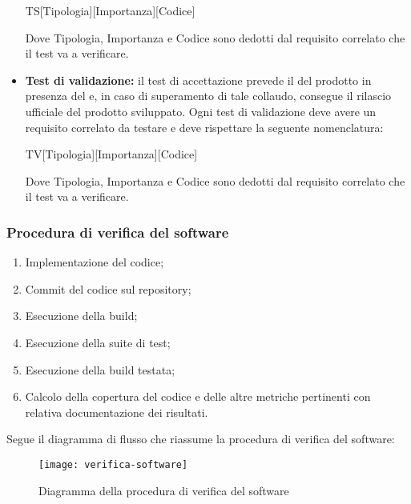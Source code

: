 \documentclass[../NormediProgetto.tex]{subfiles}
\begin{document}
\begin{itemize}
    \begin{center}
        TS[Tipologia][Importanza][Codice]
    \end{center}

    Dove Tipologia, Importanza e Codice sono dedotti dal requisito correlato che il test va a verificare.

    \item \textbf{Test di validazione:} il test di accettazione prevede il  del prodotto in presenza del  e, in caso di superamento di tale collaudo, consegue il rilascio ufficiale del prodotto sviluppato. Ogni test di validazione deve avere un requisito correlato da testare e deve rispettare la seguente nomenclatura:

    \begin{center}
        TV[Tipologia][Importanza][Codice]
    \end{center}

    Dove Tipologia, Importanza e Codice sono dedotti dal requisito correlato che il test va a verificare.

\end{itemize}

\subsubsection{Procedura di verifica del software}

\begin{enumerate}
    \item Implementazione del codice;
    
    \item Commit del codice sul repository;
    
    \item Esecuzione della build;
    
    \item Esecuzione della suite di test;
    
    \item Esecuzione della build testata;
    
    \item Calcolo della copertura del codice e delle altre metriche pertinenti con relativa documentazione dei risultati.
\end{enumerate}
    
Segue il diagramma di flusso che riassume la procedura di verifica del software:

\begin{figure}[H]
   	\texttt{[image: verifica-software]}
   	\centering
   	\caption{Diagramma della procedura di verifica del software}
\end{figure}
\end{document}
